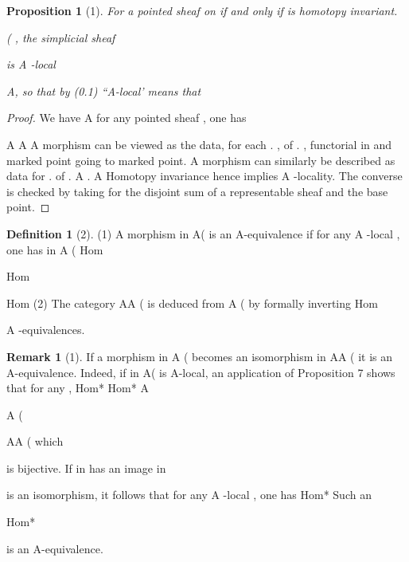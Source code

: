 \documentclass[11pt,a4paper]{article}
\theoremstyle{plain}
\newtheorem{proposition}[theorem]{Proposition}
\theoremstyle{definition}
\newtheorem{definition}[theorem]{Definition}
\newtheorem{remark}[theorem]{Remark}
\begin{document}
\begin{proposition}[1]
For a pointed sheaf on
if and only if is homotopy invariant.

 

( , the simplicial sheaf

is A -local

     A, so that by (0.1) ``A-local' means that

\end{proposition}

\begin{proof} We have
 A
for any pointed sheaf , one has



  A  A 
A morphism 
can be viewed as the data, for each .  , of . 
, functorial in  and marked point going to marked point. A morphism 
can similarly be described as data for .   of .    A .
  A
Homotopy invariance hence implies A -locality. The converse is checked by taking
for  the disjoint sum of a representable sheaf and the base point.

\end{proof}

\begin{definition}[2]
(1) A morphism  
 in A( is an A-equivalence if
for any A -local  , one has in A (
Hom

 

Hom

    Hom 
(2) The category AA  ( is deduced from A ( by formally inverting
Hom

A -equivalences.

\end{definition}

\begin{remark}[1]
If a morphism in A ( becomes an isomorphism in AA
( it is an A-equivalence. Indeed, if  in A( is A-local, an application of Proposition 7 shows that for any  ,
Hom*  
Hom*  
A

 



A (

AA ( which

is bijective. If
in
has an image in


is an isomorphism, it follows that for any A -local , one has
Hom*
Such an



    Hom*  

 is an A-equivalence.



\end{remark}
\end{document}
